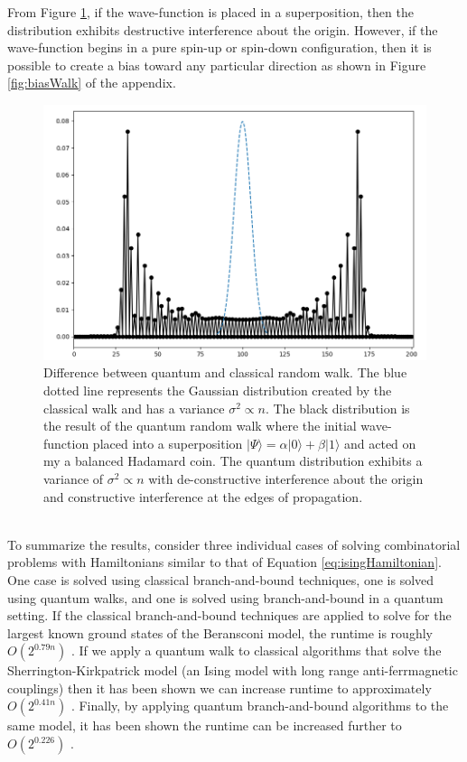 		From Figure \ref{fig:quantumWalk}, if the wave-function is placed in a superposition, then the distribution exhibits destructive interference about the origin.
		However, if the wave-function begins in a pure spin-up or spin-down configuration, then it is possible to create a bias toward any particular direction as shown in Figure \ref{fig:biasWalk} of the appendix.
	\begin{figure}[h]
		\begin{center}
			\includegraphics[width=12cm]{images/afunc2}
		\end{center}
		\caption{Difference between quantum and classical random walk. The blue dotted line represents the Gaussian distribution created by the classical walk and has a variance $\sigma^2 \propto n$. The black distribution is the result of the quantum random walk where the initial wave-function placed into a superposition $|\Psi\rangle = \alpha|0\rangle + \beta|1\rangle$ and acted on my a balanced Hadamard coin. The quantum distribution exhibits a variance of $\sigma^2 \propto n$ with de-constructive interference about the origin and constructive interference at the edges of propagation.}
		\label{fig:quantumWalk}
	\end{figure}\\
	To summarize the results, consider three individual cases of solving combinatorial problems with Hamiltonians similar to that of Equation \ref{eq:isingHamiltonian}.
	One case is solved using classical branch-and-bound techniques, one is solved using quantum walks, and one is solved using branch-and-bound in a quantum setting. 
	If the classical branch-and-bound techniques are applied to solve for the largest known ground states of the Beransconi model, the runtime is roughly $O(2^{0.79n})$ \cite{packebusch2016low}. 
	If we apply a quantum walk to classical algorithms that solve the Sherrington-Kirkpatrick model (an Ising model with long range anti-ferrmagnetic couplings) then it has been shown we can increase runtime to approximately $O(2^{0.41n})$ \cite{callison2019finding}. 
	Finally, by applying quantum branch-and-bound algorithms to the same model, it has been shown the runtime can be increased further to $O(2^{0.226})$ \cite{montanaro2020quantum}.
